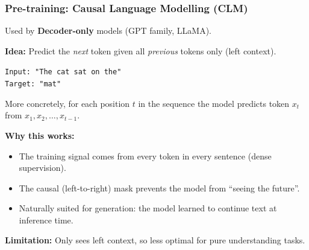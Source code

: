\begin{frame}[fragile]\frametitle{Pre-training: Causal Language Modelling (CLM)}

Used by \textbf{Decoder-only} models (GPT family, LLaMA).

\textbf{Idea:} Predict the \emph{next} token given all \emph{previous} tokens only (left context).

\begin{center}
\texttt{Input:  "The cat sat on the"}\\
\texttt{Target: "mat"}
\end{center}

More concretely, for each position $t$ in the sequence the model predicts token $x_t$ from $x_1, x_2, \ldots, x_{t-1}$.

\textbf{Why this works:}
\begin{itemize}
\item The training signal comes from every token in every sentence (dense supervision).
\item The causal (left-to-right) mask prevents the model from ``seeing the future''.
\item Naturally suited for generation: the model learned to continue text at inference time.
\end{itemize}

\textbf{Limitation:} Only sees left context, so less optimal for pure understanding tasks.

\end{frame}

